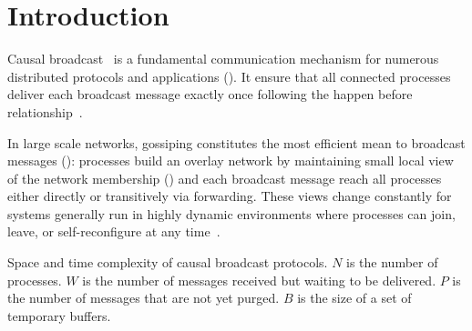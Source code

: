 
\section{Introduction}


Causal broadcast~\cite{hadzilacos1994modular} is a fundamental communication
mechanism for numerous distributed protocols and applications (\REF).
It ensure that all connected processes deliver each broadcast message exactly
once following the happen before
relationship~\cite{lamport1978time,schwarz1994detecting}.

In large scale networks, gossiping constitutes the most efficient mean to
broadcast messages (\REF): processes build an overlay network by maintaining
small local view of the network membership (\REF) and each broadcast message
reach all processes either directly or transitively via forwarding. These views
change constantly for systems generally run in highly dynamic environments where
processes can join, leave, or self-reconfigure at any
time~\cite{mostefaoui2005static}.





\begin{table}
  \caption{\label{table:comparison} Space and time complexity of causal
    broadcast protocols. 
    $N$ is the number of processes. 
    $W$ is the number of messages received but waiting to be delivered.
    $P$ is the number of messages that are not yet purged.
    $B$ is the size of a set of temporary buffers.}
  
\end{table}

